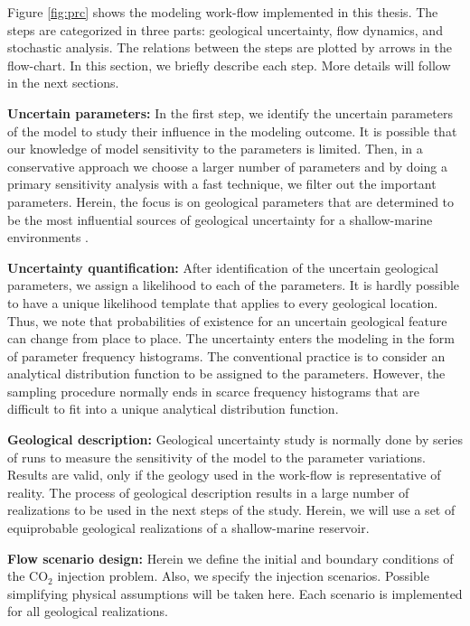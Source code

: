 Figure \ref{fig:prc} shows the modeling work-flow implemented in this thesis. The steps are categorized in three parts: geological uncertainty,
flow dynamics, and stochastic analysis. The relations between the steps are plotted by arrows in the flow-chart. In this section, we briefly describe each step. More details will follow in the next sections.

\textbf{Uncertain parameters:} In the first step, we identify the uncertain
parameters of the model  to study their influence in the modeling outcome. It is possible that our knowledge of model sensitivity to the parameters is limited. Then, in a conservative approach we choose a larger number of parameters and by doing a primary sensitivity analysis with a fast technique, we filter out the important parameters. Herein, the focus is on geological parameters that are determined to be the most influential sources of geological uncertainty for a shallow-marine environments \cite{howell2008sedimentological}.

\textbf{Uncertainty quantification:} After identification of the uncertain
geological parameters, we assign a likelihood to each of the parameters. It is hardly possible to have a unique likelihood template that applies to every
geological location. Thus, we note that probabilities of existence for an
uncertain geological feature can change from place to place. The uncertainty
enters the modeling in the form of parameter frequency histograms. The
conventional practice is to consider an analytical distribution function to be
assigned to the parameters. However, the sampling procedure normally ends in
scarce frequency histograms that are difficult to fit into a unique analytical
distribution function.

\textbf{Geological description:} Geological uncertainty study is normally done
by series of runs to measure the sensitivity of the model to the parameter
variations. Results are valid, only if the geology used in the work-flow is
representative of reality. The process of geological description results in a
large number of realizations to be used in the next steps of the study. Herein, we will use a set of equiprobable geological realizations of a shallow-marine reservoir.

\textbf{Flow scenario design:} Herein we define the initial and boundary
conditions of the $\mbox{CO}_2$ injection problem. Also, we specify the
injection scenarios. Possible simplifying physical assumptions will be taken
here. Each scenario is implemented for all geological realizations.

